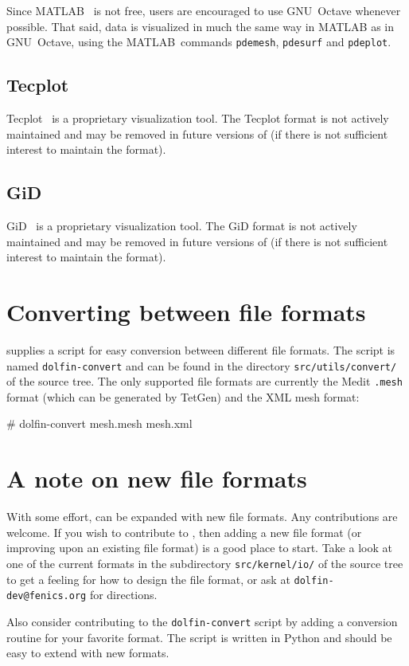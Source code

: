 Since MATLAB~\cite{www:MATLAB} is not free, users are encouraged to
use GNU~Octave whenever possible. That said, data is visualized in
much the same way in MATLAB as in GNU~Octave, using the
MATLAB~commands \texttt{pdemesh}, \texttt{pdesurf} and
\texttt{pdeplot}.

\subsection{Tecplot}

Tecplot~\cite{www:Tecplot} is a proprietary visualization tool.
The Tecplot format is not actively maintained and may be removed in
future versions of \dolfin{} (if there is not sufficient interest to
maintain the format).

\subsection{GiD}

GiD~\cite{www:GiD} is a proprietary visualization tool.
The GiD format is not actively maintained and may be removed in
future versions of \dolfin{} (if there is not sufficient interest to
maintain the format).

\section{Converting between file formats}

\dolfin{} supplies a script for easy conversion between different file
formats.  The script is named \texttt{dolfin-convert} and can be found
in the directory \texttt{src/utils/convert/} of the \dolfin{} source
tree. The only supported file formats are currently the Medit
\texttt{.mesh} format (which can be generated by TetGen) and the
\dolfin{} XML mesh format:
\begin{code}
  # dolfin-convert mesh.mesh mesh.xml
\end{code}

\section{A note on new file formats}

With some effort, \dolfin{} can be expanded with new file formats. Any
contributions are welcome. If you wish to contribute to \dolfin{},
then adding a new file format (or improving upon an existing file
format) is a good place to start. Take a look at one of the current
formats in the subdirectory \texttt{src/kernel/io/} of the \dolfin{}
source tree to get a feeling for how to design the file format, or ask
at \texttt{dolfin-dev@fenics.org} for directions.

Also consider contributing to the \texttt{dolfin-convert} script by
adding a conversion routine for your favorite format. The script is
written in Python and should be easy to extend with new formats.
